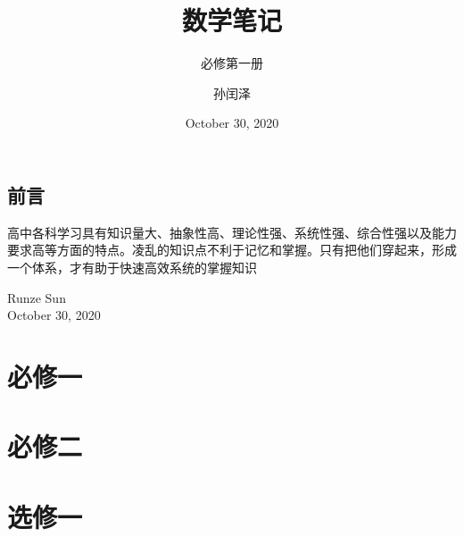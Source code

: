 \documentclass[lang=cn,11pt,chinese]{elegantbook}
\title{数学笔记}
\subtitle{必修第一册}
\author{孙闰泽}
\institute{山东省桓台第二中学}
\date{October 30, 2020}
\begin{document}
\maketitle
\frontmatter

\chapter*{前言}
高中各科学习具有知识量大、抽象性高、理论性强、系统性强、综合性强以及能力要求高等方面的特点。凌乱的知识点不利于记忆和掌握。只有把他们穿起来，形成一个体系，才有助于快速高效系统的掌握知识
\vskip 1.5cm

\begin{flushright}
Runze Sun\\
October 30, 2020
\end{flushright}

\tableofcontents

\mainmatter

\part{必修一}











\part{必修二}


\part{选修一}

\nocite{*} 

\appendix




\end{document}
